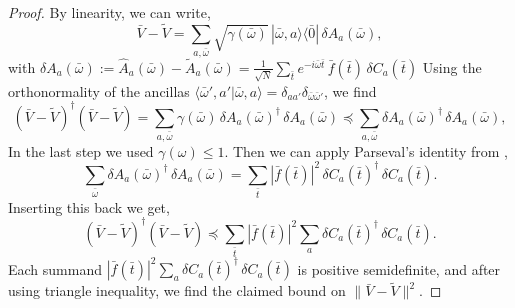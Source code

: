 \begin{proof}
    By linearity, we can write,
    $$
    \bar{V} - \tilde{V} = \sum_{a,\bar{\omega}} \sqrt{\gamma(\bar{\omega})}\, |\bar{\omega}, a\rangle\langle \bar{0}|\, \delta A_a(\bar{\omega}),
    $$
    with $\delta A_a(\bar{\omega}) := \hat{A}_a(\bar{\omega}) - \tilde{A}_a(\bar{\omega}) = \frac{1}{\sqrt{N}} \sum_{\bar{t}} e^{-i\bar{\omega}\bar{t}}\, \bar{f}(\bar{t})\, \delta C_a(\bar{t})$
    Using the orthonormality of the ancillas $\langle \bar{\omega}', a' | \bar{\omega}, a\rangle = \delta_{aa'}\delta_{\bar{\omega}\bar{\omega}'}$, we find
    $$
    (\bar{V} - \tilde{V})^\dagger(\bar{V} - \tilde{V}) = \sum_{a,\bar{\omega}} \gamma(\bar{\omega})\, \delta A_a(\bar{\omega})^\dagger\, \delta A_a(\bar{\omega}) \preceq \sum_{a,\bar{\omega}} \delta A_a(\bar{\omega})^\dagger\, \delta A_a(\bar{\omega}),
    $$
    In the last step we used $\gamma(\omega) \leq 1$. Then we can apply Parseval's identity from \cite[Proposition A.1]{chen2023quantum},
    $$
    \sum_{\bar{\omega}} \delta A_a(\bar{\omega})^\dagger\, \delta A_a(\bar{\omega}) = \sum_{\bar{t}} |\bar{f}(\bar{t})|^2\, \delta C_a(\bar{t})^\dagger\, \delta C_a(\bar{t}).
    $$
    Inserting this back we get, 
    $$
    (\bar{V} - \tilde{V})^\dagger(\bar{V} - \tilde{V}) \preceq \sum_{\bar{t}} |\bar{f}(\bar{t})|^2 \sum_a \delta C_a(\bar{t})^\dagger\, \delta C_a(\bar{t}).
    $$
    Each summand $|\bar{f}(\bar{t})|^2 \sum_a \delta C_a(\bar{t})^\dagger\, \delta C_a(\bar{t})$ is positive semidefinite, and after using triangle inequality, we find the claimed bound on $\|\bar{V} - \tilde{V}\|^2$. 


\end{proof}
